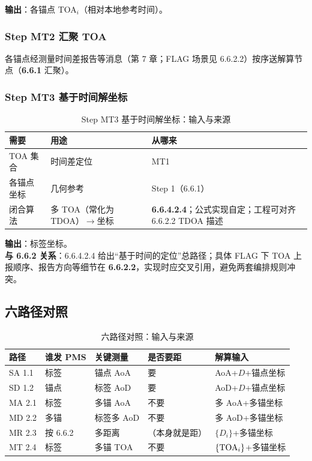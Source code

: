 \documentclass[11pt,a4paper]{ctexart}
\begin{document}
\textbf{输出}：各锚点 TOA$_i$（相对本地参考时间）。

\subsubsection{Step MT2 汇聚 TOA}

各锚点经测量时间差报告等消息（第 7 章；FLAG 场景见 6.6.2.2）按序送解算节点（\textbf{6.6.1} 汇聚）。

\subsubsection{Step MT3 基于时间解坐标}

\begin{longtable}{L{3.4cm}L{4.8cm}L{4.8cm}}
\caption{Step MT3 基于时间解坐标：输入与来源\label{tab:step136}} \\
\toprule
\textbf{需要} & \textbf{用途} & \textbf{从哪来} \\
\midrule
TOA 集合 & 时间差定位 & MT1 \\
各锚点坐标 & 几何参考 & Step 1（6.6.1） \\
闭合算法 & 多 TOA（常化为 TDOA）$\rightarrow$坐标 &
  \textbf{6.6.4.2.4}；公式实现自定；工程可对齐 6.6.2.2 TDOA 描述 \\
\bottomrule
\end{longtable}

\textbf{输出}：标签坐标。\\
\textbf{与 6.6.2 关系}：6.6.4.2.4 给出``基于时间的定位''总路径；具体 FLAG 下 TOA 上报顺序、报告方向等细节在 \textbf{6.6.2.2}，实现时应交叉引用，避免两套编排规则冲突。

\subsection{六路径对照}

\begin{longtable}{L{2.0cm}L{2.2cm}L{2.4cm}L{2.4cm}L{3.2cm}}
\caption{六路径对照：输入与来源\label{tab:step137}} \\
\toprule
\textbf{路径} & \textbf{谁发 PMS} & \textbf{关键测量} & \textbf{是否要距} & \textbf{解算输入} \\
\midrule
SA 1.1 & 标签 & 锚点 AoA & 要 & AoA+$D$+锚点坐标 \\
SD 1.2 & 锚点 & 标签 AoD & 要 & AoD+$D$+锚点坐标 \\
MA 2.1 & 标签 & 多锚 AoA & 不要 & 多 AoA+多锚坐标 \\
MD 2.2 & 多锚 & 标签多 AoD & 不要 & 多 AoD+多锚坐标 \\
MR 2.3 & 按 6.6.2 & 多距离 & （本身就是距） & $\{D_i\}$+多锚坐标 \\
MT 2.4 & 标签 & 多锚 TOA & 不要 & $\{{\rm TOA}_i\}$+多锚坐标 \\
\bottomrule
\end{longtable}
\end{document}
